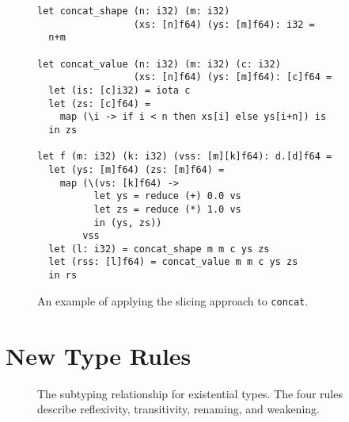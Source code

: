 \begin{figure}

\begin{lstlisting}[xleftmargin=0pt]
let concat_shape (n: i32) (m: i32)
                 (xs: [n]f64) (ys: [m]f64): i32 =
  n+m

let concat_value (n: i32) (m: i32) (c: i32)
                 (xs: [n]f64) (ys: [m]f64): [c]f64 =
  let (is: [c]i32) = iota c
  let (zs: [c]f64) =
    map (\i -> if i < n then xs[i] else ys[i+n]) is
  in zs

let f (m: i32) (k: i32) (vss: [m][k]f64): d.[d]f64 =
  let (ys: [m]f64) (zs: [m]f64) =
    map (\(vs: [k]f64) ->
          let ys = reduce (+) 0.0 vs
          let zs = reduce (*) 1.0 vs
          in (ys, zs))
        vss
  let (l: i32) = concat_shape m m c ys zs
  let (rss: [l]f64) = concat_value m m c ys zs
  in rs
\end{lstlisting}

  \caption{An example of applying the slicing approach to \lstinline{concat}.}
  \label{fig:FShapeSlice}
\end{figure}

\section{New Type Rules}
\label{sec:size-type-rules}

\begin{figure}





\caption{The subtyping relationship for existential types.  The four
  rules describe reflexivity, transitivity, renaming, and weakening.}
  \label{fig:ext-type-operations}
\end{figure}

